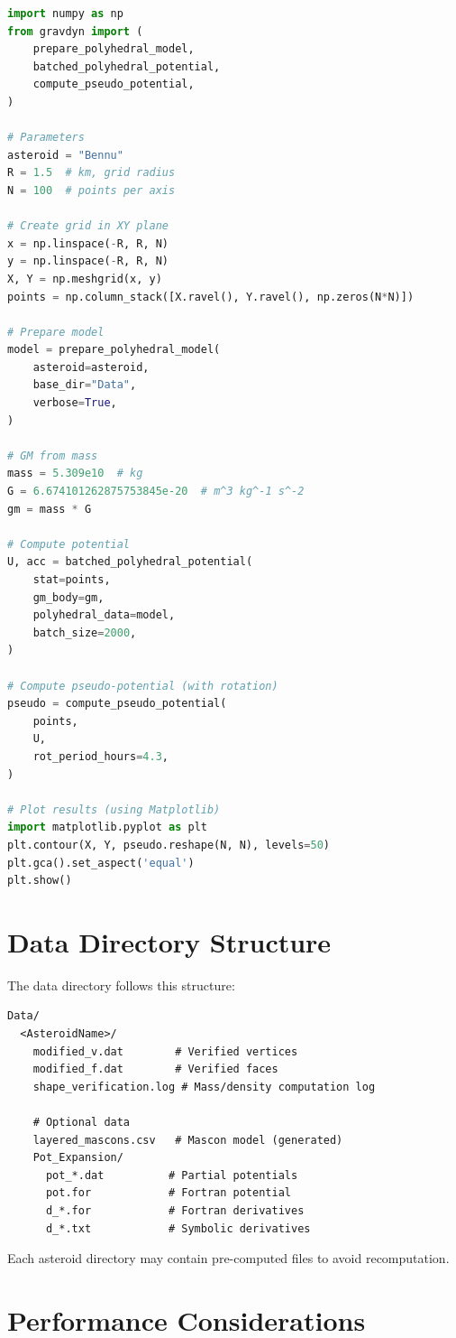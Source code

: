 \documentclass[a4paper,12pt]{article}
\begin{document}
\begin{lstlisting}[language=Python]
import numpy as np
from gravdyn import (
    prepare_polyhedral_model,
    batched_polyhedral_potential,
    compute_pseudo_potential,
)

# Parameters
asteroid = "Bennu"
R = 1.5  # km, grid radius
N = 100  # points per axis

# Create grid in XY plane
x = np.linspace(-R, R, N)
y = np.linspace(-R, R, N)
X, Y = np.meshgrid(x, y)
points = np.column_stack([X.ravel(), Y.ravel(), np.zeros(N*N)])

# Prepare model
model = prepare_polyhedral_model(
    asteroid=asteroid,
    base_dir="Data",
    verbose=True,
)

# GM from mass
mass = 5.309e10  # kg
G = 6.674101262875753845e-20  # m^3 kg^-1 s^-2
gm = mass * G

# Compute potential
U, acc = batched_polyhedral_potential(
    stat=points,
    gm_body=gm,
    polyhedral_data=model,
    batch_size=2000,
)

# Compute pseudo-potential (with rotation)
pseudo = compute_pseudo_potential(
    points,
    U,
    rot_period_hours=4.3,
)

# Plot results (using Matplotlib)
import matplotlib.pyplot as plt
plt.contour(X, Y, pseudo.reshape(N, N), levels=50)
plt.gca().set_aspect('equal')
plt.show()
\end{lstlisting}

\section{Data Directory Structure}

The data directory follows this structure:

\begin{verbatim}
Data/
  <AsteroidName>/
    modified_v.dat        # Verified vertices
    modified_f.dat        # Verified faces
    shape_verification.log # Mass/density computation log
    
    # Optional data
    layered_mascons.csv   # Mascon model (generated)
    Pot_Expansion/
      pot_*.dat          # Partial potentials
      pot.for            # Fortran potential
      d_*.for            # Fortran derivatives
      d_*.txt            # Symbolic derivatives
\end{verbatim}

Each asteroid directory may contain pre-computed files to avoid recomputation.

\section{Performance Considerations}
\end{document}
